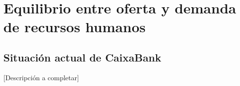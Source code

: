 %
%
%
%
%

\section{Equilibrio entre oferta y demanda de recursos humanos}

\subsection{Situación actual de CaixaBank}


[Descripción a completar]

